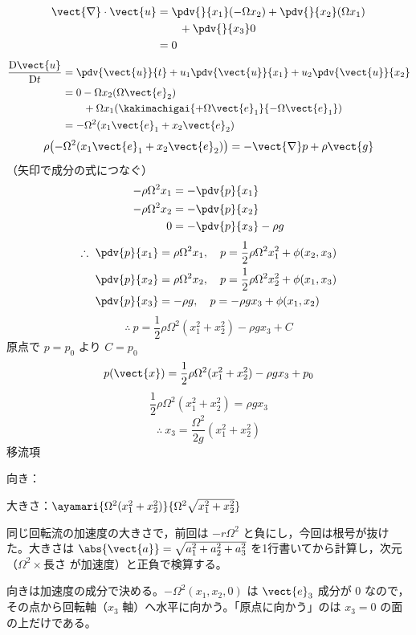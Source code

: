 \begin{align*}
\vect{\nabla}\cdot\vect{u}&=\pdv{}{x_{1}}(-\Omega x_{2})+\pdv{}{x_{2}}(\Omega x_{1})\\
&\qquad+\pdv{}{x_{3}}0\\
&=0
\end{align*}
\begin{align*}
\frac{\mathrm{D}\vect{u}}{\mathrm{D}t}&=\pdv{\vect{u}}{t}+u_{1}\pdv{\vect{u}}{x_{1}}+u_{2}\pdv{\vect{u}}{x_{2}}\\
&=0-\Omega x_{2}(\Omega\vect{e}_{2})\\
&\qquad+\Omega x_{1}(\kakimachigai{+\Omega\vect{e}_{1}}{-\Omega\vect{e}_{1}})\\
&=-\Omega^{2}(x_{1}\vect{e}_{1}+x_{2}\vect{e}_{2})
\end{align*}
\[ \rho\bigl(-\Omega^{2}(x_{1}\vect{e}_{1}+x_{2}\vect{e}_{2})\bigr)=-\vect{\nabla}p+\rho\vect{g} \]
（矢印で成分の式につなぐ）
\begin{align*}
-\rho\Omega^{2}x_{1}&=-\pdv{p}{x_{1}}\\
-\rho\Omega^{2}x_{2}&=-\pdv{p}{x_{2}}\\
0&=-\pdv{p}{x_{3}}-\rho g
\end{align*}
\begin{align*}
\therefore\ \pdv{p}{x_{1}}&=\rho\Omega^{2}x_{1},\quad p=\frac{1}{2}\rho\Omega^{2}x_{1}^{2}+\phi(x_{2},x_{3})\\
\pdv{p}{x_{2}}&=\rho\Omega^{2}x_{2},\quad p=\frac{1}{2}\rho\Omega^{2}x_{2}^{2}+\phi(x_{1},x_{3})\\
\pdv{p}{x_{3}}&=-\rho g,\quad p=-\rho gx_{3}+\phi(x_{1},x_{2})
\end{align*}
\[ \therefore\ p=\frac{1}{2}\rho\Omega^{2}(x_{1}^{2}+x_{2}^{2})-\rho gx_{3}+C \]
原点で $p=p_{0}$ より $C=p_{0}$
\[ p(\vect{x})=\frac{1}{2}\rho\Omega^{2}(x_{1}^{2}+x_{2}^{2})-\rho gx_{3}+p_{0} \]
\[ \frac{1}{2}\rho\Omega^{2}(x_{1}^{2}+x_{2}^{2})=\rho gx_{3} \]
\[ \therefore\ x_{3}=\frac{\Omega^{2}}{2g}(x_{1}^{2}+x_{2}^{2}) \]
移流項

向き：

大きさ：$\ayamari{\Omega^{2}(x_{1}^{2}+x_{2}^{2})}{\Omega^{2}\sqrt{x_{1}^{2}+x_{2}^{2}}}$
\item {} 同じ回転流の加速度の大きさで，前回は $-r\Omega^{2}$ と負にし，今回は根号が抜けた。大きさは $\abs{\vect{a}}=\sqrt{a_{1}^{2}+a_{2}^{2}+a_{3}^{2}}$ を1行書いてから計算し，次元（$\Omega^{2}\times$長さ が加速度）と正負で検算する。
\item 向きは加速度の成分で決める。$-\Omega^{2}(x_{1},x_{2},0)$ は $\vect{e}_{3}$ 成分が $0$ なので，その点から回転軸（$x_{3}$ 軸）へ水平に向かう。「原点に向かう」のは $x_{3}=0$ の面の上だけである。
